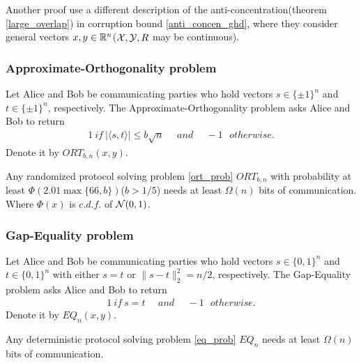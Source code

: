 \begin{rmk}
Another proof\cite{vidick2012concentration} use a different description of the anti-concentration(theorem \ref{large_overlap}) in corruption bound \eqref{anti_concen_ghd}, where they consider general vectors $x,y\in\mathbb{R}^n$($\mathcal{X},\mathcal{Y}, R$ may be continuous).
\end{rmk}
\subsubsection{Approximate-Orthogonality problem}
\begin{prob}
\label{ort_prob}
Let Alice and Bob be communicating parties who hold vectors $s\in\{\pm1\}^n$ and $t\in\{\pm1\}^n$, respectively. The Approximate-Orthogonality problem asks Alice and Bob to return
\begin{align*}
    1~if~|\langle s,t \rangle|\le b\sqrt{n}~~~~~~and~~~~~~-1~~~otherwise.
\end{align*}
Denote it by $ORT_{b,n}(x,y)$.
\end{prob}

\begin{thm}
\label{ort_complexity}
Any randomized protocol solving problem \ref{ort_prob} $ORT_{b,n}$ with probability at least $\Phi(2.01\max\{66,b\})$($b>1/5$) needs at least $\Omega(n)$ bits of communication. Where $\Phi(x)$
is $c.d.f.$ of $\mathcal{N}(0,1)$.
\end{thm}
\subsubsection{Gap-Equality problem}
\begin{prob}
\label{eq_prob}
Let Alice and Bob be communicating parties who hold vectors $s\in\{0,1\}^n$ and $t\in\{0,1\}^n$ with either $s=t$ or $\|s-t\|_2^2=n/2$, respectively. The Gap-Equality problem asks Alice and Bob to return
\begin{align*}
    1~if~s=t~~~~~~and~~~~~~-1~~~otherwise.
\end{align*}
Denote it by $EQ_{n}(x,y)$.
\end{prob}
\begin{thm}
\label{eq_complexity}
Any deterministic protocol solving problem \ref{eq_prob} $EQ_n$ needs at least $\Omega(n)$ bits of communication.
\end{thm}

